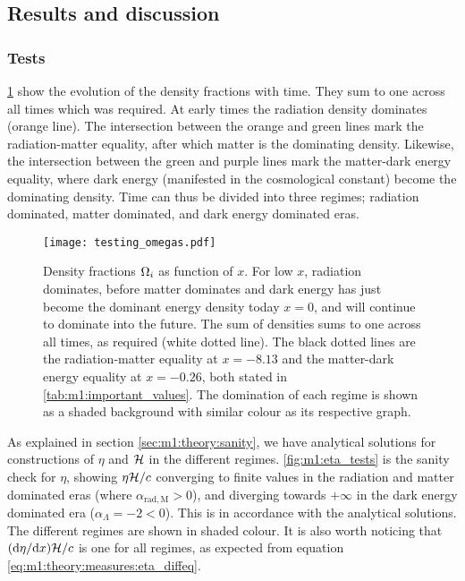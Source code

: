 \subsection{Results and discussion}\label{sec:m1:results}

\subsubsection{Tests}\label{sec:m1:results:tests}
    \cref{fig:m1:omega_tests} show the evolution of the density fractions with time. They sum to one across all times which was required. At early times the radiation density dominates (orange line). The intersection between the orange and green lines mark the radiation-matter equality, after which matter is the dominating density. Likewise, the intersection between the green and purple lines mark the matter-dark energy equality, where dark energy (manifested in the cosmological constant) become the dominating density. Time can thus be divided into three regimes; radiation dominated, matter dominated, and dark energy dominated eras. 
    \begin{figure}
        \texttt{[image: testing\_omegas.pdf]}
        \caption{Density fractions $\Omega_i$ as function of $x$. For low $x$, radiation dominates, before matter dominates and dark energy has just become the dominant energy density today $x=0$, and will continue to dominate into the future. The sum of densities sums to one across all times, as required (white dotted line). The black dotted lines are the radiation-matter equality at $x=-8.13$ and the matter-dark energy equality at $x=-0.26$, both stated in \cref{tab:m1:important_values}. The domination of each regime is shown as a shaded background with similar colour as its respective graph. }
        \label{fig:m1:omega_tests}
    \end{figure}

    As explained in section \cref{sec:m1:theory:sanity}, we have analytical solutions for constructions of $\eta$ and $\mathcal{H}$ in the different regimes. \cref{fig:m1:eta_tests} is the sanity check for $\eta$, showing $\eta\mathcal{H}/c$ converging to finite values in the radiation and matter dominated eras (where $\alpha_{\mathrm{rad}, \mathrm{M}}>0$), and diverging towards $+\infty$ in the dark energy dominated era ($\alpha_\Lambda =-2 <0$). This is in accordance with the analytical solutions. The different regimes are shown in shaded colour. It is also worth noticing that $(\mathrm{d} \eta /\mathrm{d} x)\mathcal{H}/c$ is one for all regimes, as expected from equation \cref{eq:m1:theory:measures:eta_diffeq}.

